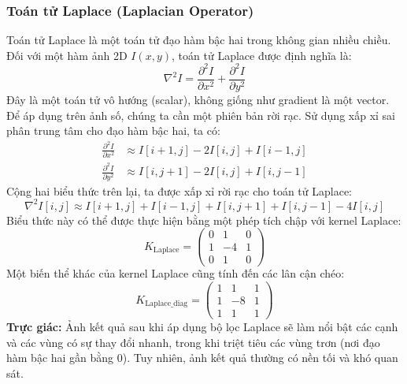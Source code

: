 \subsubsection{Toán tử Laplace (Laplacian Operator)}
\label{subsubsec:laplacian_operator}
Toán tử Laplace là một toán tử đạo hàm bậc hai trong không gian nhiều chiều. Đối với một hàm ảnh 2D $I(x, y)$, toán tử Laplace được định nghĩa là:
\begin{equation}
    \nabla^2 I = \frac{\partial^2 I}{\partial x^2} + \frac{\partial^2 I}{\partial y^2}
    \label{eq:laplacian_definition}
\end{equation}
Đây là một toán tử vô hướng (scalar), không giống như gradient là một vector. Để áp dụng trên ảnh số, chúng ta cần một phiên bản rời rạc. Sử dụng xấp xỉ sai phân trung tâm cho đạo hàm bậc hai, ta có:
\begin{align}
    \frac{\partial^2 I}{\partial x^2} &\approx I[i+1, j] - 2I[i, j] + I[i-1, j] \\
    \frac{\partial^2 I}{\partial y^2} &\approx I[i, j+1] - 2I[i, j] + I[i, j-1]
\end{align}
Cộng hai biểu thức trên lại, ta được xấp xỉ rời rạc cho toán tử Laplace:
\begin{equation}
    \nabla^2 I[i, j] \approx I[i+1, j] + I[i-1, j] + I[i, j+1] + I[i, j-1] - 4I[i, j]
    \label{eq:discrete_laplacian}
\end{equation}
Biểu thức này có thể được thực hiện bằng một phép tích chập với kernel Laplace:
\begin{equation}
    K_{\text{Laplace}} = \begin{pmatrix} 0 & 1 & 0 \\ 1 & -4 & 1 \\ 0 & 1 & 0 \end{pmatrix}
\end{equation}
Một biến thể khác của kernel Laplace cũng tính đến các lân cận chéo:
\begin{equation}
    K_{\text{Laplace\_diag}} = \begin{pmatrix} 1 & 1 & 1 \\ 1 & -8 & 1 \\ 1 & 1 & 1 \end{pmatrix}
\end{equation}
\textbf{Trực giác:} Ảnh kết quả sau khi áp dụng bộ lọc Laplace sẽ làm nổi bật các cạnh và các vùng có sự thay đổi nhanh, trong khi triệt tiêu các vùng trơn (nơi đạo hàm bậc hai gần bằng 0). Tuy nhiên, ảnh kết quả thường có nền tối và khó quan sát.

